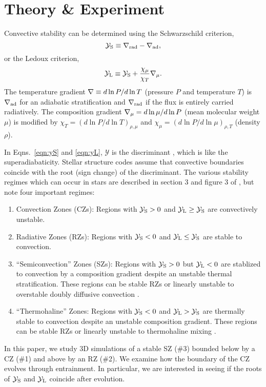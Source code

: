 \section{Theory \& Experiment}
\label{sec:theory}
Convective stability can be determined using the Schwarzschild criterion,
\begin{equation}
    \yS \equiv \gradrad - \gradad,
    \label{eqn:yS}
\end{equation}
or the Ledoux criterion,
\begin{equation}
    \yL \equiv \yS +  \frac{\chi_\mu}{\chi_T}\gradmu.
    \label{eqn:yL}
\end{equation}
The temperature gradient $\nabla \equiv d \ln P / d \ln T$ (pressure $P$ and temperature $T$) is $\nabla_{\rm{ad}}$ for an adiabatic stratification and $\nabla_{\rm{rad}}$ if the flux is entirely carried radiatively.
The composition gradient $\nabla_{\mu} = d\ln\mu/d\ln P$ (mean molecular weight $\mu$) is modified by $\chi_T = (d\ln P / d\ln T)_{\rho,\mu}$ and $\chi_\mu = (d\ln P / d\ln\mu)_{\rho,T}$ (density $\rho$).

In Eqns.~\ref{eqn:yS} and \ref{eqn:yL}, $\mathcal{Y}$ is the discriminant \citep[e.g.,][sec.~2]{mesa4}, which is like the superadiabaticity.
Stellar structure codes assume that convective boundaries coincide with the root (sign change) of the discriminant.
The various stability regimes which can occur in stars are described in section 3 and figure 3 of \citet{salaris_cassisi_2017}, but note four important regimes:
\begin{enumerate}
    \item Convection Zones (CZs): Regions with $\mathcal{Y}_{\rm{S}} > 0$ and $\mathcal{Y}_{\rm{L}} \geq \mathcal{Y}_{\rm{S}}$ are convectively unstable.
    \item Radiative Zones (RZs): Regions with $\mathcal{Y}_{\rm{S}} < 0$ and $\mathcal{Y}_{\rm{L}} \leq \mathcal{Y}_{\rm{S}}$ are stable to convection.
    \item ``Semiconvection'' Zones (SZs): Regions with $\mathcal{Y}_{\rm{S}} > 0$ but $\mathcal{Y}_{\rm{L}} < 0$ are stablized to convection by a composition gradient despite an unstable thermal stratification.
        These regions can be stable RZs or linearly unstable to overstable doubly diffusive convection \citep[ODDC, see][chapter 2]{garaud_2018}.
    \item ``Thermohaline'' Zones: Regions with $\mathcal{Y}_{\rm{S}} < 0$ and $\mathcal{Y}_{\rm{L}} > \mathcal{Y}_{\rm{S}}$ are thermally stable to convection despite an unstable composition gradient.
        These regions can be stable RZs or linearly unstable to thermohaline mixing \citep[see][chapter 3]{garaud_2018}.
\end{enumerate}
In this paper, we study 3D simulations of a stable SZ (\#3) bounded below by a CZ (\#1) and above by an RZ (\#2).
We examine how the boundary of the CZ evolves through entrainment.
In particular, we are interested in seeing if the roots of $\mathcal{Y}_{\rm{S}}$ and $\mathcal{Y}_{\rm{L}}$ coincide after evolution.

